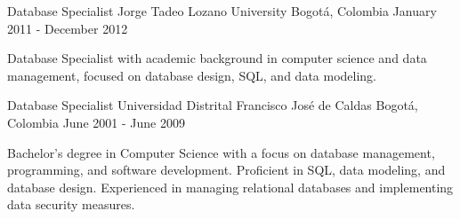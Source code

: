 

\begin{cventries}
  \cventry
    {Database Specialist} %
    {Jorge Tadeo Lozano University} %
    {Bogotá, Colombia} %
    {January 2011 - December 2012} %
    {
      \begin{cvitems} %
        \item {Database Specialist with academic background in computer science and data management, focused on database design, SQL, and data modeling.}
      \end{cvitems}
    }
  \cventry
    {Database Specialist} %
    {Universidad Distrital Francisco José de Caldas} %
    {Bogotá, Colombia} %
    {June 2001 - June 2009} %
    {
      \begin{cvitems} %
        \item {Bachelor's degree in Computer Science with a focus on database management, programming, and software development. Proficient in SQL, data modeling, and database design. Experienced in managing relational databases and implementing data security measures.}
      \end{cvitems}
    }

\end{cventries}
